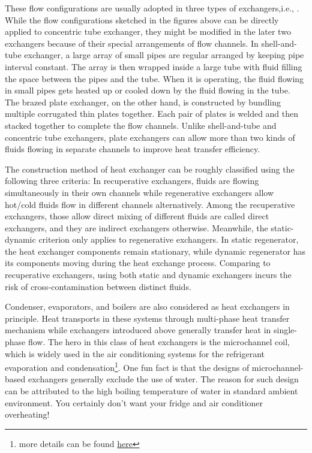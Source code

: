 These flow configurations are usually adopted in three types of exchangers,i.e., . While the flow configurations sketched in the figures above can be directly applied to concentric tube exchanger, they might be modified in the later two exchangers because of their special arrangements of flow channels. In shell-and-tube exchanger, a large array of small pipes are regular arranged by keeping pipe interval constant. The array is then wrapped inside a large tube with fluid filling the space between the pipes and the tube. When it is operating, the fluid flowing in small pipes gets heated up or cooled down by the fluid flowing in the tube. The brazed plate exchanger, on the other hand, is constructed by bundling multiple corrugated thin plates together. Each pair of plates is welded and then stacked together to complete the flow channels. Unlike shell-and-tube and concentric tube exchangers, plate exchangers can allow more than two kinds of fluids flowing in separate channels to improve heat transfer efficiency.

The construction method of heat exchanger can be roughly classified using the following three criteria:  In recuperative exchangers, fluids are flowing simultaneously in their own channels while regenerative exchangers allow hot/cold fluids flow in different channels alternatively. Among the recuperative exchangers, those allow direct mixing of different fluids are called direct exchangers, and they are indirect exchangers otherwise. Meanwhile, the static-dynamic criterion only applies to regenerative exchangers. In static regenerator, the heat exchanger components remain stationary, while dynamic regenerator has its components moving during the heat exchange process. Comparing to recuperative exchangers, using both static and dynamic exchangers incurs the risk of cross-contamination between distinct fluids.

Condenser, evaporators, and boilers are also considered as heat exchangers in principle. Heat transports in these systems through multi-phase heat transfer mechanism while exchangers introduced above generally transfer heat in single-phase flow. The hero in this class of heat exchangers is the microchannel coil, which is widely used in the air conditioning systems for the refrigerant evaporation and condensation\footnote{more details can be found \href{https://hvacrschool.com/need-know-microchannel/}{here}}. One fun fact is that the designs of microchannel-based exchangers generally exclude the use of water. The reason for such design can be attributed to the high boiling temperature of water in standard ambient environment. You certainly don't want your fridge and air conditioner overheating!
